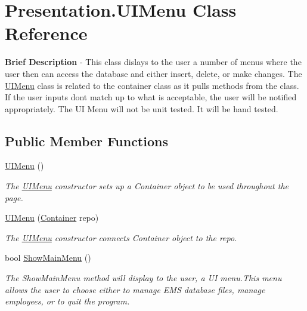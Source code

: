 \hypertarget{class_presentation_1_1_u_i_menu}{}\section{Presentation.\+U\+I\+Menu Class Reference}
\label{class_presentation_1_1_u_i_menu}


{\bfseries Brief Description} -\/ This class dislays to the user a number of menus where the user then can access the database and either insert, delete, or make changes. The \hyperlink{class_presentation_1_1_u_i_menu}{U\+I\+Menu} class is related to the container class as it pulls methods from the class. If the user inputs don\textquotesingle{}t match up to what is acceptable, the user will be notified appropriately. The U\+I Menu will not be unit tested. It will be hand tested.  


\subsection*{Public Member Functions}
\begin{DoxyCompactItemize}
\item 
\hyperlink{class_presentation_1_1_u_i_menu_aecce7fd9ed4696929cbcada2da8c4c2c}{U\+I\+Menu} ()
\begin{DoxyCompactList}\small\item\em The \hyperlink{class_presentation_1_1_u_i_menu}{U\+I\+Menu} constructor sets up a Container object to be used throughout the page. \end{DoxyCompactList}\item 
\hyperlink{class_presentation_1_1_u_i_menu_ac27724c06cbdcddbcf940f812ba307e3}{U\+I\+Menu} (\hyperlink{class_the_company_1_1_container}{Container} repo)
\begin{DoxyCompactList}\small\item\em The \hyperlink{class_presentation_1_1_u_i_menu}{U\+I\+Menu} constructor connects Container object to the repo. \end{DoxyCompactList}\item 
bool \hyperlink{class_presentation_1_1_u_i_menu_aa358c475a580c724b992458425649ada}{Show\+Main\+Menu} ()
\begin{DoxyCompactList}\small\item\em The Show\+Main\+Menu method will display to the user, a U\+I menu.\+This menu allows the user to choose either to manage E\+M\+S database files, manage employees, or to quit the program. \end{DoxyCompactList}\end{DoxyCompactItemize}
